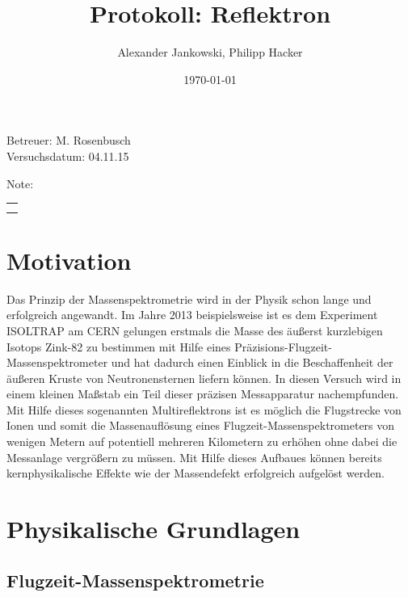 \documentclass[numbers=noenddot,a4paper,notitlepage,twoside,BCOR15mm]{scrartcl}
\title{Protokoll: Reflektron}
\author{Alexander Jankowski, Philipp Hacker}
\date{\today}
\begin{document}
	\maketitle
	\begin{center}
		Betreuer: M. Rosenbusch \\ 
		Versuchsdatum: 04.11.15\\ 
		\begin{table}[h]
			\centering
			Note:
			\begin{tabularx}{1.5cm}{|X|}
				\hline \\ \\
				\hline
			\end{tabularx}
		\end{table}
	\end{center}
	\vspace*{\fill}
	\tableofcontents
	\vfill
	\newpage
	\section{Motivation}
	
	Das Prinzip der Massenspektrometrie wird in der Physik schon lange und erfolgreich angewandt. Im Jahre 2013 beispielsweise ist es dem Experiment ISOLTRAP am CERN gelungen erstmals die Masse des äußerst kurzlebigen Isotops Zink-82 zu bestimmen mit Hilfe eines Präzisions-Flugzeit-Massenspektrometer und hat dadurch einen Einblick in die Beschaffenheit der äußeren Kruste von Neutronensternen liefern können. In diesen Versuch wird in einem kleinen Maßstab ein Teil dieser präzisen Messapparatur nachempfunden. Mit Hilfe dieses sogenannten Multireflektrons ist es möglich die Flugstrecke von Ionen und somit die Massenauflösung eines Flugzeit-Massenspektrometers von wenigen Metern auf potentiell mehreren Kilometern zu erhöhen ohne dabei die Messanlage vergrößern zu müssen. Mit Hilfe dieses Aufbaues können bereits kernphysikalische Effekte wie der Massendefekt erfolgreich aufgelöst werden.
	
	\newpage
	\section{Physikalische Grundlagen}
	
		\subsection{Flugzeit-Massenspektrometrie}
		
\end{document}
